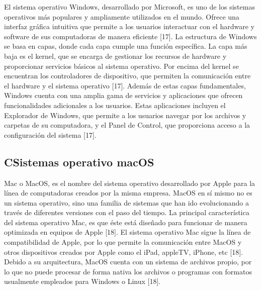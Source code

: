 \begin{list}{}%
    {\setlength{\leftmargin}{1cm}\setlength{\rightmargin}{1cm}}
    \item\relax
    \small

El sistema operativo Windows, desarrollado por Microsoft, es uno de los sistemas operativos más populares y ampliamente utilizados en el mundo. Ofrece una interfaz gráfica intuitiva que permite a los usuarios interactuar con el hardware y software de sus computadoras de manera eficiente [17].
La estructura de Windows se basa en capas, donde cada capa cumple una función específica. La capa más baja es el kernel, que se encarga de gestionar los recursos de hardware y proporcionar servicios básicos al sistema operativo. Por encima del kernel se encuentran los controladores de dispositivo, que permiten la comunicación entre el hardware y el sistema operativo [17].
Además de estas capas fundamentales, Windows cuenta con una amplia gama de servicios y aplicaciones que ofrecen funcionalidades adicionales a los usuarios. Estas aplicaciones incluyen el Explorador de Windows, que permite a los usuarios navegar por los archivos y carpetas de su computadora, y el Panel de Control, que proporciona acceso a la configuración del sistema [17]. 

\end{list}


\subsection{CSistemas operativo macOS}

\begin{list}{}%
    {\setlength{\leftmargin}{1cm}\setlength{\rightmargin}{1cm}}
    \item\relax
    \small

Mac o MacOS, es el nombre del sistema operativo desarrollado por Apple para la línea de computadoras creados por la misma empresa. MacOS en sí mismo no es un sistema operativo, sino una familia de sistemas que han ido evolucionando a través de diferentes versiones con el paso del tiempo. La principal característica del sistema operativo Mac, es que éste está diseñado para funcionar de manera optimizada en equipos de Apple [18].
El sistema operativo Mac sigue la línea de compatibilidad de Apple, por lo que permite la comunicación entre MacOS y otros dispositivos creados por Apple como el iPad, appleTV, iPhone, etc [18].
Debido a su arquitectura, MacOS cuenta con un sistema de archivos propio, por lo que no puede procesar de forma nativa los archivos o programas con formatos usualmente empleados para Windows o Linux [18].

\end{list}


